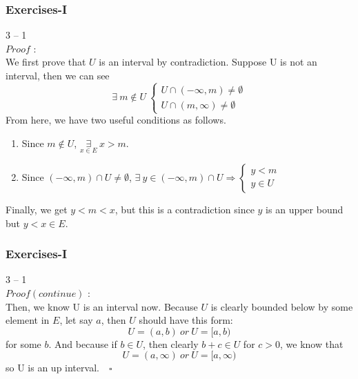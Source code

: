 \documentclass[12pt, t]{beamer}
\begin{document}
\begin{frame}
    \frametitle{Exercises-I}
3 -- 1\\
$Proof$ : \\
\hspace{1em} We first prove that $U$ is an interval by contradiction. Suppose U is not an interval, then we can see 
\begin{equation*}
    \exists\ m\notin U\ 
    \begin{cases}
        U\cap(-\infty, m)\neq \emptyset\\
        U\cap(m,\infty)\neq \emptyset
    \end{cases}
\end{equation*}
\hspace{1em} From here, we have two useful conditions as follows.
    \begin{enumerate}
        \item Since $m\notin U$, $\underset{x\in E}{\exists}\ x>m $.
        \item Since $(-\infty,m)\cap U\neq \emptyset$, $\exists\ y\in (-\infty,m)\cap U\Rightarrow 
        \begin{cases}
          y<m\\
          y\in U  
        \end{cases}$
    \end{enumerate}
\hspace{1em} Finally, we get $y<m<x$, but this is a contradiction since $y$ is an upper bound but $y<x\in E$.
\end{frame}

\begin{frame}
    \frametitle{Exercises-I}
3 -- 1\\
$Proof(continue)$ : \\
\hspace{1em} Then, we know U is an interval now. Because $U$ is clearly bounded below by some element in $E$, let say $a$, then 
$U$ should have this form:
\begin{equation*}
    U=(a,b)\ or\ U=[a,b)
\end{equation*}
for some $b$. And because if $b\in U$, then clearly $b+c\in U$ for $c>0$, we know that 
\begin{equation*}
    U=(a,\infty)\ or\ U=[a,\infty)
\end{equation*}
so U is an up interval.$\quad \square$

\end{frame}
\end{document}
